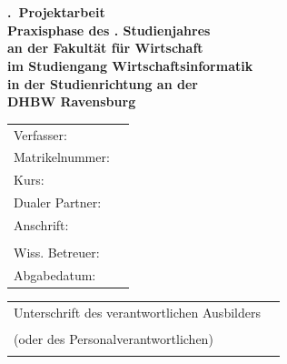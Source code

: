 \begin{titlepage}
	\begin{center}
		\vspace*{1cm}
		\LARGE\bf\myTopic\\
		\Large\rm\mySubTopic\\
		\vspace*{2cm}
		\bf \myProjNumber.~Projektarbeit\\
		\vspace*{0.5cm}\singlespacing
		\normalsize\rm
		Praxisphase des \myPraxPhase. Studienjahres \\
		\vspace*{0.5cm}\singlespacing
		an der Fakultät für Wirtschaft\\
		im Studiengang Wirtschaftsinformatik\\
		in der Studienrichtung \myFieldOfStudy
		\vspace*{0.5cm}\singlespacing
		an der\\
		DHBW Ravensburg
		\vfill
	\end{center}
	\begin{tabular}{ll}
		Verfasser:&\myAutor\\
		Matrikelnummer:&\myMatNr\\
		Kurs:&\myKurs\\
		Dualer Partner:&\myCompany\\
		Anschrift:&\myCompanyAddressStreet\\
		&\myCompanyAddressCity\\
		Wiss. Betreuer:&\myProf\\
		Abgabedatum:&\myEndDate\\
	\end{tabular}
	\newline
	\vspace*{1cm}
	\newline
	\begin{tabularx}{\textwidth}{l@{\extracolsep\fill}r}
	  Unterschrift des verantwortlichen Ausbilders&\\
	  (oder des Personalverantwortlichen)&\rule{6cm}{0.3mm}\\
	\end{tabularx}
\end{titlepage}
\newpage
\setcounter{page}{2}
